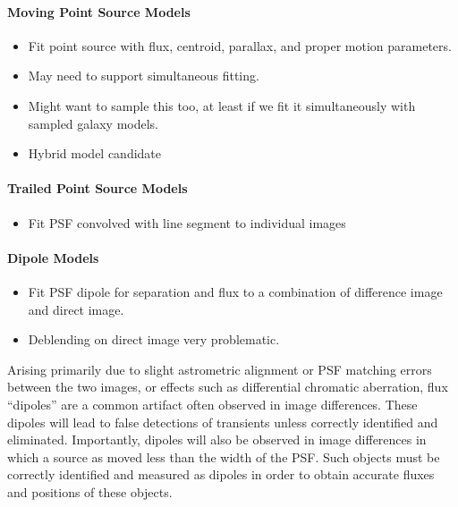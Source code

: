 \paragraph{Moving Point Source Models}
\label{sec:acMovingPointSourceModels}
\begin{itemize}
\item Fit point source with flux, centroid, parallax, and proper motion parameters.
\item May need to support simultaneous fitting.
\item Might want to sample this too, at least if we fit it simultaneously with sampled galaxy models.
\item Hybrid model candidate
\end{itemize}

\paragraph{Trailed Point Source Models}
\label{sec:acTrailedPointSourceModels}
\begin{itemize}
\item Fit PSF convolved with line segment to individual images
\end{itemize}

\paragraph{Dipole Models}
\label{sec:acDipoleModels}
\begin{itemize}
\item Fit PSF dipole for separation and flux to a combination of difference image and direct image.
\item Deblending on direct image very problematic.
\end{itemize}

Arising primarily due to slight astrometric alignment or PSF matching errors between the two images, or effects such as differential chromatic aberration, flux “dipoles” are a common artifact often observed in image differences. These dipoles will lead to false detections of transients unless correctly identified and eliminated. Importantly, dipoles will also be observed in image differences in which a source as moved less than the width of the PSF. Such objects must be correctly identified and measured as dipoles in order to obtain accurate fluxes and positions of these objects. 

